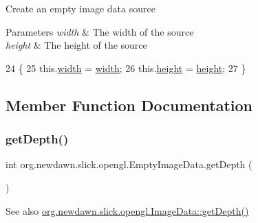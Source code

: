 Create an empty image data source


\begin{DoxyParams}{Parameters}
{\em width} & The width of the source \\
\hline
{\em height} & The height of the source \\
\hline
\end{DoxyParams}

\begin{DoxyCode}
24                                                  \{
25         this.\mbox{\hyperlink{classorg_1_1newdawn_1_1slick_1_1opengl_1_1_empty_image_data_a0db414de2bae9de9483a7f3481c48b5e}{width}} = \mbox{\hyperlink{classorg_1_1newdawn_1_1slick_1_1opengl_1_1_empty_image_data_a0db414de2bae9de9483a7f3481c48b5e}{width}};
26         this.\mbox{\hyperlink{classorg_1_1newdawn_1_1slick_1_1opengl_1_1_empty_image_data_a190ee87309a0084066aad436a0fc267c}{height}} = \mbox{\hyperlink{classorg_1_1newdawn_1_1slick_1_1opengl_1_1_empty_image_data_a190ee87309a0084066aad436a0fc267c}{height}};
27     \}
\end{DoxyCode}


\subsection{Member Function Documentation}
\mbox{\label{classorg_1_1newdawn_1_1slick_1_1opengl_1_1_empty_image_data_a59090f7878211b179bcca316e3ea3e2f}} 
\subsubsection{\texorpdfstring{get\+Depth()}{getDepth()}}
{\footnotesize\ttfamily int org.\+newdawn.\+slick.\+opengl.\+Empty\+Image\+Data.\+get\+Depth (\begin{DoxyParamCaption}{ }\end{DoxyParamCaption})\hspace{0.3cm}{\ttfamily [inline]}}

\begin{DoxySeeAlso}{See also}
\mbox{\hyperlink{interfaceorg_1_1newdawn_1_1slick_1_1opengl_1_1_image_data_a69be40348e05222e8f0c65f5845adcb9}{org.\+newdawn.\+slick.\+opengl.\+Image\+Data\+::get\+Depth()}} 
\end{DoxySeeAlso}


